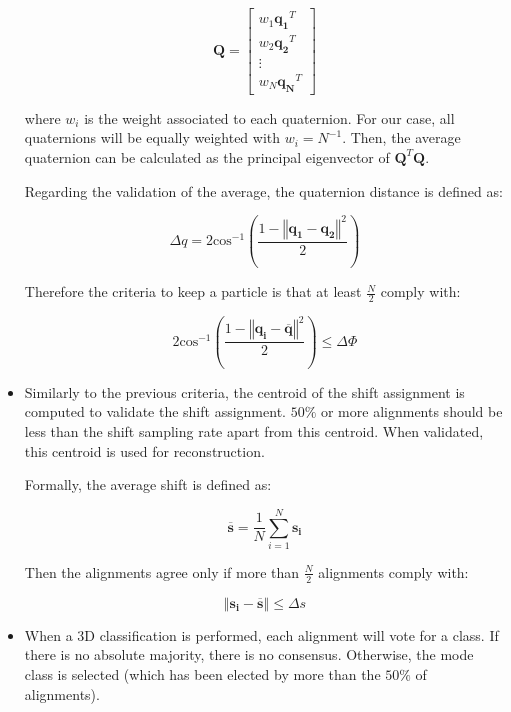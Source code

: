 \documentclass[../main.tex]{subfiles}
\begin{document}
\begin{itemize}
    \begin{equation}
        \bm{Q} = 
        \begin{bmatrix}
            w_1 \bm{q_1}^T \\
            w_2 \bm{q_2}^T \\
            \vdots \\
            w_N \bm{q_N}^T
        \end{bmatrix}
    \end{equation}

    where $w_i$ is the weight associated to each quaternion. For our case, all quaternions will be equally weighted with $w_i = N^{-1}$. Then, the average quaternion can be calculated as the principal eigenvector of $\bm{Q}^T\bm{Q}$.

    Regarding the validation of the average, the quaternion distance is defined as:

    \begin{equation}
        \Delta q = 2 \text{cos}^{-1} \left( \frac{1 - \left\Vert \bm{q_1} - \bm{q_2} \right\Vert^2}{2} \right)
    \end{equation}

    Therefore the criteria to keep a particle is that at least $\frac{N}{2}$ comply with:

    \begin{equation}
        2 \text{cos}^{-1} \left( \frac{1 - \left\Vert \bm{q_i} - \bm{\overline{q}} \right\Vert^2}{2} \right) \leq \Delta\Phi
    \end{equation}
    

    \item Similarly to the previous criteria, the centroid of the shift assignment is computed to validate the shift assignment. $50 \si{\percent}$ or more alignments should be less than the shift sampling rate apart from this centroid. When validated, this centroid is used for reconstruction.

    Formally, the average shift is defined as:

    \begin{equation}
        \overline{\bm{s}} = \frac{1}{N} \sum_{i=1}^{N} \bm{s_i}
    \end{equation}

    Then the alignments agree only if more than $\frac{N}{2}$ alignments comply with:

    \begin{equation}
        \left\Vert \bm{s_i} - \overline{\bm{s}}  \right\Vert \leq \Delta s
    \end{equation}

    \item When a 3D classification is performed, each alignment will vote for a class. If there is no absolute majority, there is no consensus. Otherwise, the mode class is selected (which has been elected by more than the $50 \si{\percent}$ of alignments).
    
\end{itemize}
\end{document}
